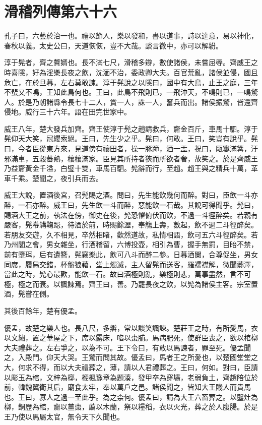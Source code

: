 \chapter{滑稽列傳第六十六}

孔子曰，六藝於治一也。禮以節人，樂以發和，書以道事，詩以達意，易以神化，春秋以義。太史公曰，天道恢恢，豈不大哉。談言微中，亦可以解紛。

淳于髡者，齊之贅婿也。長不滿七尺，滑稽多辯，數使諸侯，未嘗屈辱。齊威王之時喜隱，好為淫樂長夜之飲，沈湎不治，委政卿大夫。百官荒亂，諸侯並侵，國且危亡，在於旦暮，左右莫敢諫。淳于髡說之以隱曰，國中有大鳥，止王之庭，三年不蜚又不鳴，王知此鳥何也。王曰，此鳥不飛則已，一飛沖天，不鳴則已，一鳴驚人。於是乃朝諸縣令長七十二人，賞一人，誅一人，奮兵而出。諸侯振驚，皆還齊侵地。威行三十六年。語在田完世家中。

威王八年，楚大發兵加齊。齊王使淳于髡之趙請救兵，齎金百斤，車馬十駟。淳于髡仰天大笑，冠纓索絕。王曰，先生少之乎。髡曰，何敢。王曰，笑豈有說乎。髡曰，今者臣從東方來，見道傍有禳田者，操一豚蹄，酒一盂，祝曰，甌窶滿篝，汙邪滿車，五穀蕃熟，穰穰滿家。臣見其所持者狹而所欲者奢，故笑之。於是齊威王乃益齎黃金千溢，白璧十雙，車馬百駟。髡辭而行，至趙。趙王與之精兵十萬，革車千乘。楚聞之，夜引兵而去。

威王大說，置酒後宮，召髡賜之酒。問曰，先生能飲幾何而醉。對曰，臣飲一斗亦醉，一石亦醉。威王曰，先生飲一斗而醉，惡能飲一石哉。其說可得聞乎。髡曰，賜酒大王之前，執法在傍，御史在後，髡恐懼俯伏而飲，不過一斗徑醉矣。若親有嚴客，髡帣韝鞠跽，待酒於前，時賜餘瀝，奉觴上壽，數起，飲不過二斗徑醉矣。若朋友交遊，久不相見，卒然相睹，歡然道故，私情相語，飲可五六斗徑醉矣。若乃州閭之會，男女雜坐，行酒稽留，六博投壺，相引為曹，握手無罰，目眙不禁，前有墮珥，后有遺簪，髡竊樂此，飲可八斗而醉二參。日暮酒闌，合尊促坐，男女同席，履舄交錯，杯盤狼藉，堂上燭滅，主人留髡而送客，羅襦襟解，微聞薌澤，當此之時，髡心最歡，能飲一石。故曰酒極則亂，樂極則悲，萬事盡然，言不可極，極之而衰。以諷諫焉。齊王曰，善。乃罷長夜之飲，以髡為諸侯主客。宗室置酒，髡嘗在側。

其後百餘年，楚有優孟。

優孟，故楚之樂人也。長八尺，多辯，常以談笑諷諫。楚莊王之時，有所愛馬，衣以文繡，置之華屋之下，席以露床，啗以棗脯。馬病肥死，使群臣喪之，欲以棺槨大夫禮葬之。左右爭之，以為不可。王下令曰，有敢以馬諫者，罪至死。優孟聞之，入殿門。仰天大哭。王驚而問其故。優孟曰，馬者王之所愛也，以楚國堂堂之大，何求不得，而以大夫禮葬之，薄，請以人君禮葬之。王曰，何如。對曰，臣請以彫玉為棺，文梓為槨，楩楓豫章為題湊，發甲卒為穿壙，老弱負土，齊趙陪位於前，韓魏翼衛其后，廟食太牢，奉以萬戶之邑。諸侯聞之，皆知大王賤人而貴馬也。王曰，寡人之過一至此乎。為之柰何。優孟曰，請為大王六畜葬之。以壟灶為槨，銅歷為棺，齎以薑棗，薦以木蘭，祭以糧稻，衣以火光，葬之於人腹腸。於是王乃使以馬屬太官，無令天下久聞也。


